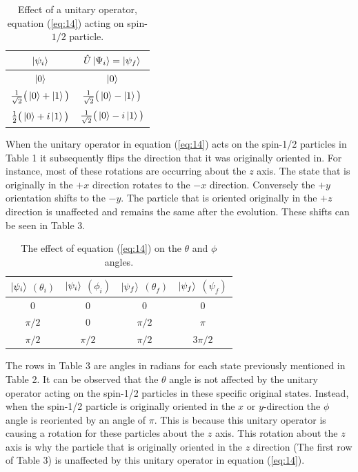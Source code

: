 \documentclass[twocolumn]{article}
\begin{document}
\begin{table}[h!]
\begin{center}
\begin{tabular}{ |c|c| }
\hline $\ket{\psi_i}$& $\hat{U}\ket{\Psi_i}=\ket{\psi_f}$ \\
\hline $\ket{0}$& $\ket{0}$\\
\hline $\frac{1}{\sqrt{2}}\big(\ket{0}+\ket{1}\big)$& $\frac{1}{\sqrt{2}}\big(\ket{0}-\ket{1}\big)$\\
\hline $\frac{1}{2}\big(\ket{0}+i\ket{1}\big)$& $\frac{1}{\sqrt{2}}\big(\ket{0}-i\ket{1}\big)$\\
\hline
\end{tabular}
\caption{Effect of a unitary operator, equation (\ref{eq:14}) acting on spin-$1/2$ particle.}
\end{center}
\end{table} 
\newline
When the unitary operator in equation (\ref{eq:14}) acts on the spin-1/2 particles in Table 1 it subsequently flips the direction that it was originally oriented in. For instance, most of these rotations are occurring about the $z$ axis. The state that is originally in the $+x$ direction rotates to the $-x$ direction. Conversely the $+y$ orientation shifts to the $-y$. The particle that is oriented originally in the $+z$ direction is unaffected and remains the same after the evolution. These shifts can be seen in Table 3.
\newline
\begin{table}[h!]
\begin{center}
\begin{tabular}{ |c|c|c|c| }
\hline $\ket{\psi_i}$ $(\theta_i)$& $\ket{\psi_i}$ $(\phi_i)$& $\ket{\psi_f}$ $(\theta_f)$& $\ket{\psi_f}$ $(\psi_f)$ \\
\hline 0 & 0 & 0 & 0 \\
\hline $\pi/2$ & 0 & $\pi/2$ & $\pi$ \\
\hline $\pi/2$ & $\pi/2$ & $\pi/2$ & $3\pi/2$ \\
\hline
\end{tabular}
\caption{The effect of equation (\ref{eq:14}) on the $\theta$ and $\phi$ angles.}
\end{center}
\end{table}
\newline

The rows in Table 3 are angles in radians for each state previously mentioned in Table 2. It can be observed that the $\theta$ angle is not affected by the unitary operator acting on the spin-1/2 particles in these specific original states. Instead, when the spin-1/2 particle is originally oriented in the $x$ or $y$-direction the $\phi$ angle is reoriented by an angle of $\pi$. This is because this unitary operator is causing a rotation for these particles about the $z$ axis. This rotation about the $z$ axis is why the particle that is originally oriented in the $z$ direction (The first row of Table 3) is unaffected by this unitary operator in equation (\ref{eq:14}).
\end{document}
